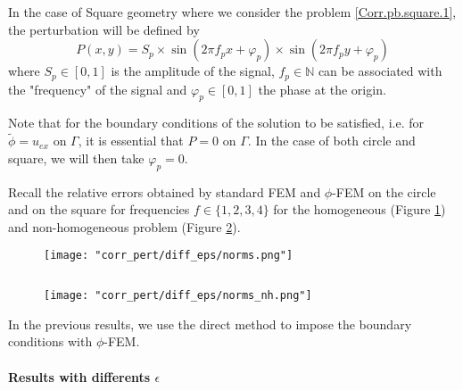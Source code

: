 In the case of Square geometry where we consider the problem \ref{Corr.pb.square.1}, the perturbation will be defined by
\begin{equation*}
	P(x,y)=S_p\times\sin\left(2\pi f_px+\varphi_p\right)\times\sin\left(2\pi f_py+\varphi_p\right)
\end{equation*}
where $S_p\in[0,1]$ is the amplitude of the signal, $f_p\in\mathbb{N}$ can be associated with the "frequency" of the signal and $\varphi_p\in[0,1]$ the phase at the origin.

\begin{Rem}
	Note that for the boundary conditions of the solution to be satisfied, i.e. for $\tilde{\phi}=u_{ex}$ on $\Gamma$, it is essential that $P=0$ on $\Gamma$. In the case of both circle and square, we will then take $\varphi_p=0$.
\end{Rem}

Recall the relative errors obtained by standard FEM and $\phi$-FEM on the circle and on the square for frequencies $f\in\{1,2,3,4\}$ for the homogeneous  (Figure \ref{norms}) and non-homogeneous problem  (Figure \ref{norms_nh}).

\begin{minipage}{0.48\linewidth}
	\begin{figure}[H]
		\centering
		\texttt{[image: "corr\_pert/diff\_eps/norms.png"]}
		\label{norms}
	\end{figure} 
\end{minipage} $\qquad$
\begin{minipage}{0.48\linewidth}
	\begin{figure}[H]
		\centering
		\texttt{[image: "corr\_pert/diff\_eps/norms\_nh.png"]}
		\label{norms_nh}
	\end{figure} 
\end{minipage}

\begin{Rem}
	In the previous results, we use the direct method to impose the boundary conditions with $\phi$-FEM.
\end{Rem}

\paragraph{Results with differents $\epsilon$} \label{Corr.results.disturbed.eps} 

